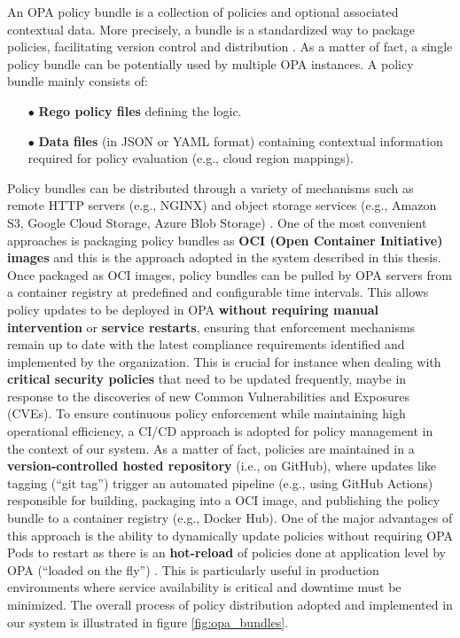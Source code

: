 An OPA policy bundle is a collection of policies and optional associated contextual data. More precisely, a bundle is a standardized way to package policies, facilitating version control and distribution \cite{opa_bundles}. As a matter of fact, a single policy bundle can be potentially used by multiple OPA instances.
A policy bundle mainly consists of:
\begin{itemize}[itemsep=0.2pt, topsep=1pt]
  \item[$\bullet$] \textbf{Rego policy files} defining the logic.
  \item[$\bullet$] \textbf{Data files} (in JSON or YAML format) containing contextual information required for policy evaluation (e.g., cloud region mappings).
\end{itemize} 

Policy bundles can be distributed through a variety of mechanisms such as remote HTTP servers (e.g., NGINX) and object storage services (e.g., Amazon S3, Google Cloud Storage, Azure Blob Storage) \cite{opa_bundles}.
One of the most convenient approaches is packaging policy bundles as \textbf{OCI (Open Container Initiative) images} \cite{oci} and this is the approach adopted in the system described in this thesis.
Once packaged as OCI images, policy bundles can be pulled by OPA servers from a container registry at predefined and configurable time intervals. 
This allows policy updates to be deployed in OPA \textbf{without requiring manual intervention} or \textbf{service restarts}, ensuring that enforcement mechanisms remain up to date with the latest compliance requirements identified and implemented by the organization. 
This is crucial for instance when dealing with \textbf{critical security policies} that need to be updated frequently, maybe in response to the discoveries of new Common Vulnerabilities and Exposures (CVEs). 
To ensure continuous policy enforcement while maintaining high operational efficiency, a CI/CD approach is adopted for policy management in the context of our system.
As a matter of fact, policies are maintained in a \textbf{version-controlled hosted repository} (i.e., on GitHub), where updates like tagging (``git tag'') trigger an automated pipeline (e.g., using GitHub Actions) responsible for building, packaging into a OCI image, and publishing the policy bundle to a container registry (e.g., Docker Hub).
One of the major advantages of this approach is the ability to dynamically update policies without requiring OPA Pods to restart as there is an \textbf{hot-reload} of policies done at application level by OPA (``loaded on the fly'') \cite{opa_bundles}. 
This is particularly useful in production environments where service availability is critical and downtime must be minimized. 
The overall process of policy distribution adopted and implemented in our system is illustrated in figure \ref{fig:opa_bundles}.


